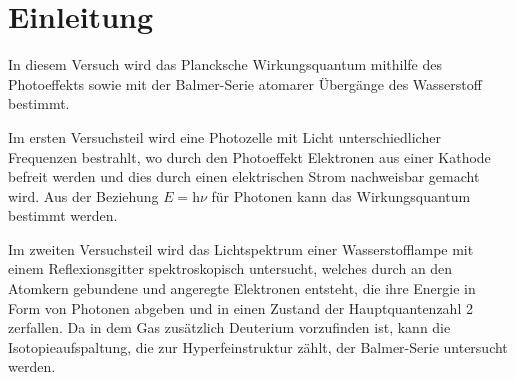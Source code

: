 \section{Einleitung}\label{sec:einleitung}

In diesem Versuch wird das Plancksche Wirkungsquantum mithilfe des Photoeffekts
sowie mit der Balmer-Serie atomarer Übergänge des Wasserstoff bestimmt.\par
Im ersten Versuchsteil wird eine Photozelle mit Licht unterschiedlicher Frequenzen 
bestrahlt, wo durch den Photoeffekt Elektronen aus einer Kathode 
befreit werden und dies durch einen elektrischen Strom 
nachweisbar gemacht wird.
Aus der Beziehung $E=\mathrm h\nu$ für Photonen kann das Wirkungsquantum bestimmt werden.\par
Im zweiten Versuchsteil wird das Lichtspektrum einer Wasserstofflampe mit einem
Reflexionsgitter spektroskopisch untersucht, welches durch an den Atomkern gebundene und
angeregte Elektronen entsteht, die ihre Energie in Form von Photonen abgeben 
und in einen Zustand der Hauptquantenzahl 2 zerfallen. Da in dem Gas zusätzlich Deuterium
vorzufinden ist, kann die Isotopieaufspaltung, die zur Hyperfeinstruktur zählt,
der Balmer-Serie untersucht werden.
